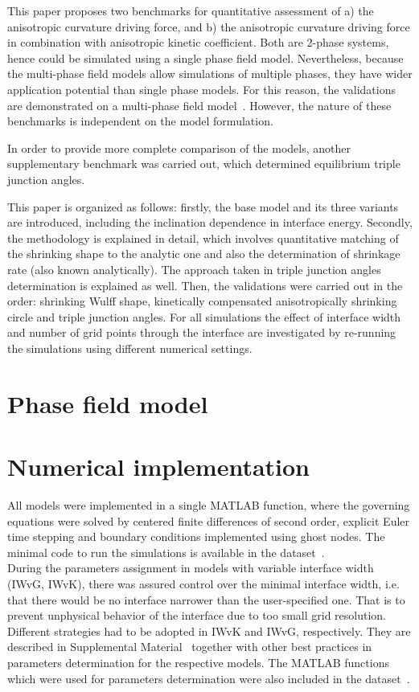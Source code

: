 This paper proposes two benchmarks for quantitative assessment of a) the anisotropic curvature driving force, and b) the anisotropic curvature driving force in combination with anisotropic kinetic coefficient. Both are 2-phase systems, hence could be simulated using a single phase field model. Nevertheless, because the multi-phase field models allow simulations of multiple phases, they have wider application potential than single phase models. For this reason, the validations are demonstrated on a multi-phase field model~\cite{Moelans2008}. However, the nature of these benchmarks is independent on the model formulation. 

In order to provide more complete comparison of the models, another supplementary benchmark was carried out, which determined equilibrium triple junction angles.

This paper is organized as follows: firstly, the base model and its three variants are introduced, including the inclination dependence in interface energy. Secondly, the methodology is explained in detail, which involves quantitative matching of the shrinking shape to the analytic one and also the determination of shrinkage rate (also known analytically). The approach taken in triple junction angles determination is explained as well. Then, the validations were carried out in the order: shrinking Wulff shape, kinetically compensated anisotropically shrinking circle and triple junction angles. For all simulations the effect of interface width and number of grid points through the interface are investigated by re-running the simulations using different numerical settings.

\section{Phase field model}


\section{Numerical implementation}
All models were implemented in a single MATLAB function, where the governing equations were solved by centered finite differences of second order, explicit Euler time stepping and boundary conditions implemented using ghost nodes. The minimal code to run the simulations is available in the dataset~\cite{Minar2022dataset}. \\
During the parameters assignment in models with variable interface width (IWvG, IWvK), there was assured control over the minimal interface width, i.e. that there would be no interface narrower than the user-specified one. That is to prevent unphysical behavior of the interface due to too small grid resolution. Different strategies had to be adopted in IWvK and IWvG, respectively. They are described in Supplemental Material~\cite{Minar2021suppl} together with other best practices in parameters determination for the respective models. The MATLAB functions which were used for parameters determination were also included in the dataset~\cite{Minar2022dataset}.

